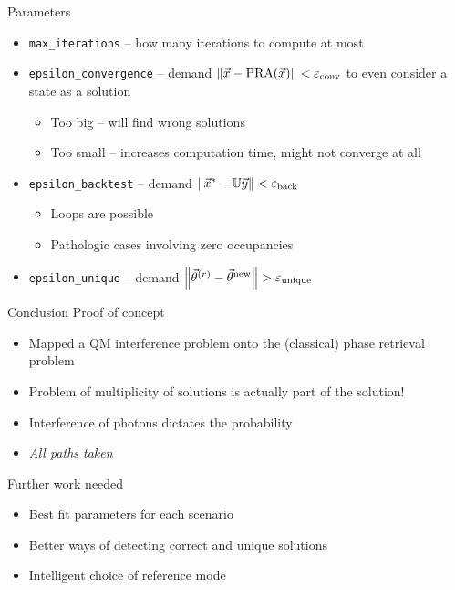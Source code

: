
\begin{frame}{Parameters}
%
\begin{itemize}
\item \texttt{max\_iterations} -- how many iterations to compute at most
\item \texttt{epsilon\_convergence} -- demand $\norm{\vec{x} - \text{PRA}(\vec{x})} < \varepsilon_{\text{conv}}$ to even consider a state as a solution
	\begin{itemize}
	\item Too big -- will find wrong solutions
	\item Too small -- increases computation time, might not converge at all
	\end{itemize}
\item \texttt{epsilon\_backtest} -- demand $\norm{\vec{x}^* - \mathbb{U} \vec{y}} < \varepsilon_{\text{back}}$
	\begin{itemize}
	\item Loops are possible
	\item Pathologic cases involving zero occupancies
	\end{itemize}
\item \texttt{epsilon\_unique} -- demand $\norm{\vec{\theta}^{(r)} - \vec{\theta}^{\text{new}}} > \varepsilon_{\text{unique}}$
\end{itemize}
%
\end{frame}


\begin{frame}{Conclusion}
%
Proof of concept
	\begin{itemize}
	\item Mapped a QM interference problem onto the (classical) phase retrieval problem
	\item Problem of multiplicity of solutions is actually part of the solution!
	\item Interference of photons dictates the probability
	\item \emph{All paths taken}
	\end{itemize}

\vspace{6pt}
Further work needed
	\begin{itemize}
	\item Best fit parameters for each scenario
	\item Better ways of detecting correct and unique solutions
	\item Intelligent choice of reference mode
	\end{itemize}
%
\end{frame}

